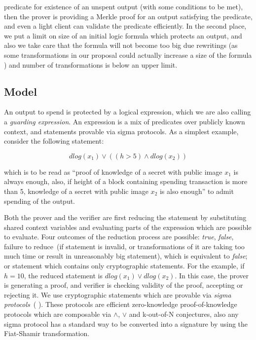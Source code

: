 \documentclass[11pt]{article}
\newcommand{\authnote}[2]{\marginpar{\parbox{\marginparwidth}{\tiny %
  \textsf{#1 {\textcolor{blue}{notes: #2}}}}}%
  \textcolor{blue}{\textbf{\dag}}}
\newcommand{\authnote}[2]{
  \textsf{#1 \textcolor{blue}{: #2}}}
\newcommand{\authnote}[2]{}
\newcommand{\knote}[1]{{\authnote{\textcolor{green}{kushti notes}}{#1}}}
\newcommand{\mnote}[1]{{\authnote{\textcolor{red}{Morphic}}{#1}}}
\begin{document}
predicate for existence of an unspent output (with some conditions to be met), then the prover is providing a Merkle proof for an output satisfying the predicate, and even a light client can validate the predicate efficiently. In the second place, we put a limit on size of an initial logic formula which protects an output, and also we take care that the formula will not become too big due rewritings (as some transformations in our proposal could actually increase a size of the formula\mnote{For example? Looks like all the transforms are decreasing.}) and number of transformations is below an upper limit.

\subsection{Model}

An output to spend is protected by a logical expression, which we are also calling a {\em guarding expression}. An expression is a mix of predicates over publicly known context, and statements provable via sigma protocols. As a simplest example, consider the following statement:

\begin{equation}
\label{eq:example1}
dlog(x_1) \lor ((h > 5) \land dlog(x_2))
\end{equation}

which is to be read as ``proof of knowledge of a secret with public image $x_1$ is always enough, also, if height of a block containing spending transaction is more than 5, knowledge of a secret with public image $x_2$ is also enough'' to admit spending of the output.

Both the prover and the verifier are first reducing the statement by substituting shared context variables and evaluating parts of the expression which are possible to evaluate. Four outcomes of the reduction process are possible: {\em true}, {\em false}, failure to reduce~(if statement is invalid, or transformations of it are taking too much time or result in unreasonably big statement), which is equivalent to {\em false}; or statement which contains only cryptographic statements. For the example, if $h = 10$, the reduced statement is $dlog(x_1) \lor dlog(x_2)$. In this case, the prover is generating a proof, and verifier is checking validity of the proof, accepting or rejecting it. We use cryptographic statements which are provable via {\em sigma protocols}~(\knote{links}). These protocols are efficient zero-knowledge \knote{special honest verifier ZK actually} proof-of-knowledge protocols which are composable via $\land$, $\lor$ and k-out-of-N conjectures, also any sigma protocol has a standard way to be converted into a signature by using the Fiat-Shamir transformation. 
\end{document}
